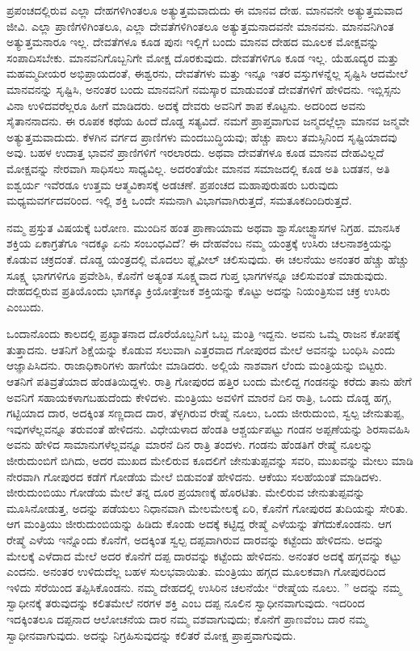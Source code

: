 ಪ್ರಪಂಚದಲ್ಲಿರುವ ಎಲ್ಲಾ ದೇಹಗಳಿಗಿಂತಲೂ ಅತ್ಯುತ್ತಮವಾದುದು ಈ ಮಾನವ ದೇಹ. ಮಾನವನೇ ಅತ್ಯುತ್ತಮವಾದ ಜೀವಿ. ಎಲ್ಲಾ ಪ್ರಾಣಿಗಳಿಗಿಂತಲೂ, ಎಲ್ಲಾ ದೇವತೆಗಳಿಗಿಂತಲೂ ಅತ್ಯುತ್ತಮನಾದವನೇ ಮಾನವನು. ಮಾನವನಿಗಿಂತ ಅತ್ಯುತ್ತಮನಾರೂ ಇಲ್ಲ. ದೇವತೆಗಳೂ ಕೂಡ ಪುನಃ ಇಲ್ಲಿಗೆ ಬಂದು ಮಾನವ ದೇಹದ ಮೂಲಕ ಮೋಕ್ಷವನ್ನು ಸಂಪಾದಿಸಬೇಕು. ಮಾನವನಿಗೊಬ್ಬನಿಗೇ ಮೋಕ್ಷ ದೊರಕುವುದು. ದೇವತೆಗಳಿಗೂ ಕೂಡ ಇಲ್ಲ. ಯೆಹೂದ್ಯರ ಮತ್ತು ಮಹಮ್ಮದೀಯರ ಅಭಿಪ್ರಾಯದಂತೆ, ಈಶ್ವರನು, ದೇವತೆಗಳು ಮತ್ತು ಇನ್ನೂ ಇತರ ವಸ್ತುಗಳನ್ನೆಲ್ಲ ಸೃಷ್ಟಿಸಿ ಆದಮೇಲೆ ಮಾನವನನ್ನು ಸೃಷ್ಟಿಸಿ, ಅನಂತರ ಬಂದು ಮಾನವನಿಗೆ ನಮಸ್ಕಾರ ಮಾಡುವಂತೆ ದೇವತೆಗಳಿಗೆ ಹೇಳಿದನು. ಇಬ್ಲಿಸ್ಸನು ವಿನಾ ಉಳಿದವರೆಲ್ಲರೂ ಹೀಗೆ ಮಾಡಿದರು. ಅದಕ್ಕೆ ದೇವರು ಅವನಿಗೆ ಶಾಪ ಕೊಟ್ಟನು. ಅದರಿಂದ ಅವನು ಸೈತಾನನಾದನು. ಈ ರೂಪಕ ಕಥೆಯ ಹಿಂದೆ ದೊಡ್ಡ ಸತ್ಯವಿದೆ. ನಮಗೆ ಪ್ರಾಪ್ತವಾಗುವ ಜನ್ಮದಲ್ಲೆಲ್ಲಾ ಮಾನವ ಜನ್ಮವೇ ಅತ್ಯುತ್ತಮವಾದುದು. ಕೆಳಗಿನ ವರ್ಗದ ಪ್ರಾಣಿಗಳು ಮಂದಬುದ್ಧಿಯವು; ಹೆಚ್ಚು ಪಾಲು ತಮಸ್ಸಿನಿಂದ ಸೃಷ್ಟಿಯಾದವು ಅವು. ಬಹಳ ಉದಾತ್ತ ಭಾವನೆ ಪ್ರಾಣಿಗಳಿಗೆ ಇರಲಾರದು. ಅಥವಾ ದೇವತೆಗಳೂ ಕೂಡ ಮಾನವ ದೇಹವಿಲ್ಲದೆ ಮೋಕ್ಷವನ್ನು ನೇರವಾಗಿ ಸಾಧಿಸಲು ಸಾಧ್ಯವಿಲ್ಲ. ಅದರಂತೆಯೇ ಮಾನವ ಸಮಾಜದಲ್ಲಿ ಕೂಡ ಅತಿ ಬಡತನ, ಅತಿ ಐಶ್ವರ್ಯ ಇವೆರಡೂ ಉತ್ತಮ ಆತ್ಮವಿಕಾಸಕ್ಕೆ ಅಡಚಣೆ. ಪ್ರಪಂಚದ ಮಹಾಪುರುಷರು ಬರುವುದು ಮಧ್ಯಮವರ್ಗದವರಿಂದ. ಇಲ್ಲಿ ಶಕ್ತಿ ಒಂದೇ ಸಮನಾಗಿ ವಿಭಾಗವಾಗಿರುತ್ತದೆ, ಸಮತೂಕದಿಂದಿರುತ್ತದೆ. 

ನಮ್ಮ ಪ್ರಸ್ತುತ ವಿಷಯಕ್ಕೆ ಬರೋಣ. ಮುಂದಿನ ಹಂತ ಪ್ರಾಣಾಯಾಮ ಅಥವಾ ಶ್ವಾಸೋಚ್ಛ್ವಾಸಗಳ ನಿಗ್ರಹ. ಮಾನಸಿಕ ಶಕ್ತಿಯ ಏಕಾಗ್ರತೆಗೂ ಇದಕ್ಕೂ ಏನು ಸಂಬಂಧವಿದೆ? ಈ ದೇಹವೆಂಬ ನಮ್ಮ ಯಂತ್ರಕ್ಕೆ ಉಸಿರು ಚಲನಾಶಕ್ತಿಯನ್ನು ಕೊಡುವ ಚಕ್ರದಂತೆ. ದೊಡ್ಡ ಯಂತ್ರದಲ್ಲಿ ಮೊದಲು ಫ್ಲೈವೀಲ್​ ಚಲಿಸುವುದು. ಈ ಚಲನೆಯು ಅನಂತರ ಹೆಚ್ಚು ಹೆಚ್ಚು ಸೂಕ್ಷ್ಮ ಭಾಗಗಳಿಗೂ ಪ್ರವೇಶಿಸಿ, ಕೊನೆಗೆ ಅತ್ಯಂತ ಸೂಕ್ಷ್ಮವಾದ ಗುಪ್ತ ಭಾಗಗಳನ್ನೂ ಚಲಿಸುವಂತೆ ಮಾಡುವುದು. ದೇಹದಲ್ಲಿರುವ ಪ್ರತಿಯೊಂದು ಭಾಗಕ್ಕೂ ಕ್ರಿಯೋತ್ತೇಜಕ ಶಕ್ತಿಯನ್ನು ಕೊಟ್ಟು ಅದನ್ನು ನಿಯಂತ್ರಿಸುವ ಚಕ್ರ ಉಸಿರು ಎಂಬುದು. 

ಒಂದಾನೊಂದು ಕಾಲದಲ್ಲಿ ಪ್ರಖ್ಯಾತನಾದ ದೊರೆಯೊಬ್ಬನಿಗೆ ಒಬ್ಬ ಮಂತ್ರಿ ಇದ್ದನು. ಅವನು ಒಮ್ಮೆ ರಾಜನ ಕೋಪಕ್ಕೆ ತುತ್ತಾದನು. ಆತನಿಗೆ ಶಿಕ್ಷೆಯನ್ನು ಕೊಡುವ ಸಲುವಾಗಿ ಎತ್ತರವಾದ ಗೋಪುರದ ಮೇಲೆ ಅವನನ್ನು ಬಂಧಿಸಿ ಎಂದು ಆಜ್ಞಾಪಿಸಿದನು. ರಾಜಾಧಿಕಾರಿಗಳು ಹಾಗೆಯೇ ಮಾಡಿದರು. ಅಲ್ಲಿಯೆ ನಾಶವಾಗ ಲೆಂದು ಮಂತ್ರಿಯನ್ನು ಬಿಟ್ಟರು. ಆತನಿಗೆ ಪತಿವ್ರತೆಯಾದ ಹೆಂಡತಿಯಿದ್ದಳು. ರಾತ್ರಿ ಗೋಪುರದ ಹತ್ತಿರ ಬಂದು ಮೇಲಿದ್ದ ಗಂಡನನ್ನು ಕರೆದು ತಾನು ಹೇಗೆ ಅವನಿಗೆ ಸಹಾಯಕಳಾಗಬಹುದೆಂದು ಕೇಳಿದಳು. ಮಂತ್ರಿಯು ಅವಳಿಗೆ ಮಾರನೆ ದಿನ ರಾತ್ರಿ, ಒಂದು ದೊಡ್ಡ ಹಗ್ಗ, ಗಟ್ಟಿಯಾದ ದಾರ, ಅದಕ್ಕಿಂತ ಸಣ್ಣದಾದ ದಾರ, ತೆಳ್ಳಗಿರುವ ರೇಷ್ಮೆ ನೂಲು, ಒಂದು ಜೀರುದುಂಬಿ, ಸ್ವಲ್ಪ ಜೇನುತುಪ್ಪ, ಇವುಗಳೆಲ್ಲವನ್ನೂ ತರುವಂತೆ ಹೇಳಿದನು. ವಿಧೇಯಳಾದ ಹೆಂಡತಿ ಆಶ್ಚರ್ಯಪಟ್ಟು ಗಂಡನ ಅಪ್ಪಣೆಯನ್ನು ಶಿರಸಾವಹಿಸಿ ಅವನು ಹೇಳಿದ ಸಾಮಾನುಗಳೆಲ್ಲವನ್ನೂ ಮಾರನೆ ದಿನ ರಾತ್ರಿ ತಂದಳು. ಗಂಡನು ಹೆಂಡತಿಗೆ ರೇಷ್ಮೆ ನೂಲನ್ನು ಜೀರುದುಂಬಿಗೆ ಬಿಗಿದು, ಅದರ ಮುಖದ ಮೇಲಿರುವ ಕೂದಲಿಗೆ ಜೇನುತುಪ್ಪವನ್ನು ಸವರಿ, ಮುಖವನ್ನು ಮೇಲು ಮಾಡಿ ನೇರವಾಗಿ ಗೋಪುರದ ಕಡೆಗೆ ಗೋಡೆಯ ಮೇಲೆ ಬಿಡುವಂತೆ ಹೇಳಿದನು. ಆಕೆಯು ಸಲಹೆಯಂತೆ ಮಾಡಿದಳು. ಜೀರುದುಂಬಿಯು ಗೋಡೆಯ ಮೇಲೆ ತನ್ನ ದೂರ ಪ್ರಯಾಣಕ್ಕೆ ಹೊರಟಿತು. ಮೇಲಿರುವ ಜೇನುತುಪ್ಪವನ್ನು ಮೂಸಿನೋಡುತ್ತ, ಅದನ್ನು ಪಡೆಯಲು ನಿಧಾನವಾಗಿ ಮೇಲಮೇಲಕ್ಕೆ ಏರಿ, ಕೊನೆಗೆ ಗೋಪುರದ ತುದಿಯನ್ನು ಸೇರಿತು. ಆಗ ಮಂತ್ರಿಯು ಜೀರುದುಂಬಿಯನ್ನು ಹಿಡಿದು ಕೊಂಡು ಅದಕ್ಕೆ ಕಟ್ಟಿದ್ದ ರೇಷ್ಮೆ ಎಳೆಯನ್ನು ತೆಗೆದುಕೊಂಡನು. ಆಗ ರೇಷ್ಮೆ ಎಳೆಯ ಇನ್ನೊಂದು ಕೊನೆಗೆ, ಅದಕ್ಕಿಂತ ಸ್ವಲ್ಪ ದಪ್ಪವಾಗಿರುವ ದಾರವನ್ನು ಕಟ್ಟೆಂದು ಹೇಳಿದನು. ಅದನ್ನು ಮೇಲಕ್ಕೆ ಎಳೆದಾದ ಮೇಲೆ ಅದರ ಕೊನೆಗೆ ದಪ್ಪ ದಾರವನ್ನು ಕಟ್ಟೆಂದು ಹೇಳಿದನು. ಅನಂತರ ಅದಕ್ಕೆ ಹಗ್ಗವನ್ನು ಕಟ್ಟು ಎಂದನು. ಅನಂತರ ಉಳಿದುದೆಲ್ಲ ಬಹಳ ಸುಲಭವಾಯಿತು. ಮಂತ್ರಿಯು ಹಗ್ಗದ ಮೂಲಕವಾಗಿ ಗೋಪುರದಿಂದ ಇಳಿದು ಸೆರೆಯಿಂದ ತಪ್ಪಿಸಿಕೊಂಡನು. ನಮ್ಮ ದೇಹದಲ್ಲಿ ಉಸಿರಿನ ಚಲನೆಯೇ “ರೇಷ್ಮೆಯ ನೂಲು. ” ಅದನ್ನು ನಮ್ಮ ಸ್ವಾಧೀನಕ್ಕೆ ತರುವುದನ್ನು ಕಲಿತಮೇಲೆ ನರಗಳ ಶಕ್ತಿ ಎಂಬ ದಪ್ಪ ನೂಲಿನ ಸ್ವಾಧೀನವಾಗುವುದು. ಇದರಿಂದ ಇದಕ್ಕಿಂತಲೂ ದಪ್ಪನಾದ ಆಲೋಚನೆಯ ದಾರ ನಮ್ಮ ವಶವಾಗುವುದು; ಕೊನೆಗೆ ಪ್ರಾಣವೆಂಬ ದಾರ ನಮ್ಮ ಸ್ವಾಧೀನವಾಗುವುದು. ಅದನ್ನು ನಿಗ್ರಹಿಸುವುದನ್ನು ಕಲಿತರೆ ಮೋಕ್ಷ ಪ್ರಾಪ್ತವಾಗುವುದು. 

